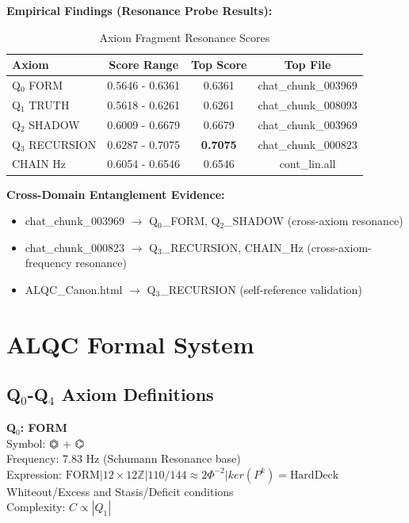 \textbf{Empirical Findings (Resonance Probe Results):}
\begin{table}[h]
\centering
\caption{Axiom Fragment Resonance Scores}
\begin{tabular}{lccc}
\toprule
Axiom & Score Range & Top Score & Top File \\
\midrule
Q$_0$ FORM & 0.5646 - 0.6361 & 0.6361 & chat\_chunk\_003969 \\
Q$_1$ TRUTH & 0.5618 - 0.6261 & 0.6261 & chat\_chunk\_008093 \\
Q$_2$ SHADOW & 0.6009 - 0.6679 & 0.6679 & chat\_chunk\_003969 \\
Q$_3$ RECURSION & 0.6287 - 0.7075 & \textbf{0.7075} & chat\_chunk\_000823 \\
CHAIN Hz & 0.6054 - 0.6546 & 0.6546 & cont\_lin.all \\
\bottomrule
\end{tabular}
\end{table}

\textbf{Cross-Domain Entanglement Evidence:}
\begin{itemize}
    \item chat\_chunk\_003969 $\to$ Q$_0$_FORM, Q$_2$_SHADOW (cross-axiom resonance)
    \item chat\_chunk\_000823 $\to$ Q$_3$_RECURSION, CHAIN\_Hz (cross-axiom-frequency resonance)
    \item ALQC\_Canon.html $\to$ Q$_3$_RECURSION (self-reference validation)
\end{itemize}

\section{ALQC Formal System}

\subsection{Q$_0$-Q$_4$ Axiom Definitions}

\textbf{Q$_0$: FORM}\\
Symbol: ⏣ + ⌬\\
Frequency: 7.83 Hz (Schumann Resonance base)\\
Expression: $\text{FORM}|12\times 12\mathbb{Z}|110/144\approx 2\Phi^{-2}|ker(P^k)=\text{HardDeck}$\\
Whiteout/Excess and Stasis/Deficit conditions\\
Complexity: $C \propto |Q_1|$

